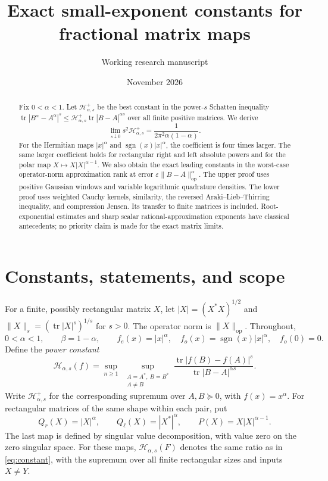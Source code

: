 \documentclass[11pt]{article}
\title{Exact small-exponent constants for fractional matrix maps}
\author{Working research manuscript}
\date{November 2026}
\numberwithin{equation}{section}
\newcommand{\tr}{\operatorname{tr}}
\newcommand{\sgn}{\operatorname{sgn}}
\newcommand{\op}{\mathrm{op}}
\newcommand{\cH}{\mathcal H}
\begin{document}
\maketitle

\begin{abstract}
Fix $0<\alpha<1$. Let $\cH^+_{\alpha,s}$ be the best constant in the
power-$s$ Schatten inequality
$\tr|B^\alpha-A^\alpha|^s\le\cH^+_{\alpha,s}\tr|B-A|^{\alpha s}$
over all finite positive matrices. We derive
\[
 \lim_{s\downarrow0}s^2\cH^+_{\alpha,s}
       =\frac{1}{2\pi^2\alpha(1-\alpha)}.
\]
For the Hermitian maps $|x|^\alpha$ and $\sgn(x)|x|^\alpha$, the
coefficient is four times larger. The same larger coefficient holds
for rectangular right and left absolute powers and for the polar map
$X\mapsto X|X|^{\alpha-1}$. We also obtain the exact leading constants
in the worst-case operator-norm approximation rank at error
$\varepsilon\|B-A\|_\op^\alpha$. The upper proof uses positive Gaussian
windows and variable logarithmic quadrature densities. The lower proof
uses weighted Cauchy kernels, similarity, the reversed
Araki--Lieb--Thirring inequality, and compression Jensen. Its transfer
to finite matrices is included. Root-exponential estimates and sharp
scalar rational-approximation exponents have classical antecedents;
no priority claim is made for the exact matrix limits.
\end{abstract}

\section{Constants, statements, and scope}

For a finite, possibly rectangular matrix $X$, let
$|X|=(X^*X)^{1/2}$ and $\|X\|_s=(\tr|X|^s)^{1/s}$ for $s>0$.
The operator norm is $\|X\|_\op$. Throughout,
\[
 0<\alpha<1,\qquad \beta=1-\alpha,
 \qquad f_e(x)=|x|^\alpha,
 \quad f_o(x)=\sgn(x)|x|^\alpha,
 \quad f_o(0)=0.
\]
Define the \emph{power constant}
\begin{equation}\label{eq:constant}
 \cH_{\alpha,s}(f)
  =\sup_{n\ge1}\ \sup_{\substack{A=A^*,\ B=B^*\\A\ne B}}
       \frac{\tr|f(B)-f(A)|^s}{\tr|B-A|^{\alpha s}}.
\end{equation}
Write $\cH^+_{\alpha,s}$ for the corresponding supremum over
$A,B\succeq0$, with $f(x)=x^\alpha$.
For rectangular matrices of the same shape within each pair, put
\[
 Q_r(X)=|X|^\alpha,\qquad Q_\ell(X)=|X^*|^\alpha,
 \qquad P(X)=X|X|^{\alpha-1}.
\]
The last map is defined by singular value decomposition, with value zero
on the zero singular space. For these maps, $\cH_{\alpha,s}(F)$ denotes
the same ratio as in \eqref{eq:constant}, with the supremum over all
finite rectangular sizes and inputs $X\ne Y$.
\end{document}
